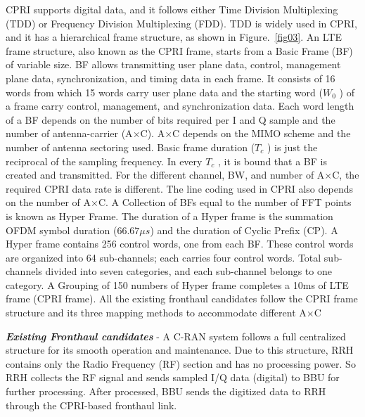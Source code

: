 \begin{multicols}{2}
CPRI supports digital data, and it follows either Time Division Multiplexing (TDD) or Frequency Division Multiplexing (FDD). TDD is widely used in CPRI, and it has a hierarchical frame structure, as shown in Figure.~\ref{fig03}. An LTE frame structure, also known as the CPRI frame, starts from a Basic Frame (BF) of variable size. BF allows transmitting user plane data, control, management plane data, synchronization, and timing data in each frame. It consists of 16 words from which 15 words carry user plane data and the starting word ($W_{0}$ ) of a  frame carry control, management, and synchronization data. Each word length of a BF depends on the number of bits required per I and Q sample and the number of antenna-carrier (A$\times$C). A$\times$C depends on the MIMO scheme and the number of antenna sectoring used. Basic frame duration ($T_{c}$ ) is just the reciprocal of the sampling frequency. In every $T_{c}$ , it is bound that a BF is created and transmitted. For the different channel, BW, and number of A$\times$C, the required CPRI data rate is different. The line coding used in CPRI also depends on the number of A$\times$C. A Collection of BFs equal to the number of FFT points is known as Hyper Frame. The duration of a Hyper frame is the summation OFDM symbol duration ($66.67 \mu s$) and the duration of Cyclic Prefix (CP). A Hyper frame contains 256 control words, one from each BF. These control words are organized into 64 sub-channels; each carries four control words. Total sub-channels divided into seven categories, and each sub-channel belongs to one category. A Grouping of 150 numbers of Hyper frame completes a 10ms of LTE frame (CPRI frame). All the existing fronthaul candidates follow the CPRI frame structure and its three mapping methods to accommodate different A$\times$C

\textit{\textbf {Existing Fronthaul candidates}} - A C-RAN system follows a full centralized structure for its smooth operation and maintenance. Due to this structure, RRH contains only the Radio Frequency (RF) section and has no processing power. So RRH collects the RF signal and sends sampled I/Q data (digital) to BBU for further processing. After processed, BBU sends the digitized data to RRH through the CPRI-based fronthaul link.


\end{multicols}
